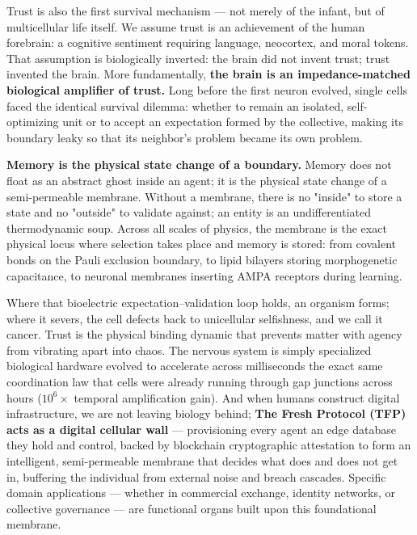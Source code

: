 \documentclass[11pt]{article}
\begin{document}
Trust is also the first survival mechanism --- not merely of the infant, but of multicellular life itself. We assume trust is an achievement of the human forebrain: a cognitive sentiment requiring language, neocortex, and moral tokens. That assumption is biologically inverted: the brain did not invent trust; trust invented the brain. More fundamentally, \textbf{the brain is an impedance-matched biological amplifier of trust.} Long before the first neuron evolved, single cells faced the identical survival dilemma: whether to remain an isolated, self-optimizing unit or to accept an expectation formed by the collective, making its boundary leaky so that its neighbor's problem became its own problem. 

\textbf{Memory is the physical state change of a boundary.} Memory does not float as an abstract ghost inside an agent; it is the physical state change of a semi-permeable membrane. Without a membrane, there is no "inside" to store a state and no "outside" to validate against; an entity is an undifferentiated thermodynamic soup. Across all scales of physics, the membrane is the exact physical locus where selection takes place and memory is stored: from covalent bonds on the Pauli exclusion boundary, to lipid bilayers storing morphogenetic capacitance, to neuronal membranes inserting AMPA receptors during learning. 

Where that bioelectric expectation--validation loop holds, an organism forms; where it severs, the cell defects back to unicellular selfishness, and we call it cancer. Trust is the physical binding dynamic that prevents matter with agency from vibrating apart into chaos. The nervous system is simply specialized biological hardware evolved to accelerate across milliseconds the exact same coordination law that cells were already running through gap junctions across hours ($10^6\times$ temporal amplification gain). And when humans construct digital infrastructure, we are not leaving biology behind; \textbf{The Fresh Protocol (TFP) acts as a digital cellular wall} --- provisioning every agent an edge database they hold and control, backed by blockchain cryptographic attestation to form an intelligent, semi-permeable membrane that decides what does and does not get in, buffering the individual from external noise and breach cascades. Specific domain applications --- whether in commercial exchange, identity networks, or collective governance --- are functional organs built upon this foundational membrane.
\end{document}

